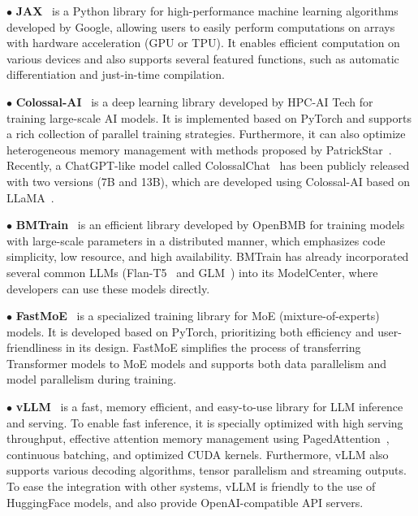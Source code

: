 {{{$\bullet$ \textbf{JAX}~\cite{Bradbury-github-2018-jax} is a Python library for high-performance machine learning algorithms developed by Google, allowing users to easily perform computations on arrays with hardware acceleration (\eg GPU or TPU).   %
{It enables  efficient computation on various devices and also supports  several featured functions, such as automatic differentiation and just-in-time compilation. 
}

{$\bullet$ \textbf{Colossal-AI}~\cite{Bian-CoRR-2021-Colossal-AI} is a deep learning library developed by HPC-AI Tech for training large-scale AI models. It is implemented based on PyTorch and supports a rich collection of  parallel training  strategies.
Furthermore, it can also optimize heterogeneous memory management with methods proposed by PatrickStar~\cite{Fang-arxiv-2021-PatrickStar}.
{Recently, a ChatGPT-like model called ColossalChat~\cite{ColossalChat} has been publicly released with two versions (7B and 13B), which are developed 
using Colossal-AI based on LLaMA~\cite{Touvron-arxiv-2023-LLaMA}.}}

$\bullet$  {\textbf{BMTrain}~\cite{BMTrain} is an efficient library developed by OpenBMB for training models with large-scale parameters in a distributed manner, which emphasizes code simplicity, low resource, and high availability. BMTrain has already incorporated several common LLMs (\eg Flan-T5~\cite{Chung-arxiv-2022-Scaling} and GLM~\cite{Zeng-arxiv-2022-GLM}) into its ModelCenter, where developers can use these models directly.}

$\bullet$ {\textbf{FastMoE}~\cite{He-arXiv-2021-FastMoE} is a specialized training library for MoE (\ie mixture-of-experts) models. It is developed {based on} PyTorch, prioritizing both efficiency and user-friendliness in its design. FastMoE simplifies the process of transferring Transformer models to MoE models and supports both data parallelism and model parallelism during training. }

{$\bullet$ {\textbf{vLLM}~\cite{kwon-2023-SIGOPS-efficient} is a fast, memory efficient, and easy-to-use library for LLM inference and serving. 
To enable fast  inference, it is specially optimized with high serving throughput, effective attention memory management using PagedAttention~\cite{kwon-2023-SIGOPS-efficient}, continuous batching, and optimized CUDA kernels.
Furthermore, vLLM also supports  various decoding algorithms, tensor parallelism and streaming outputs.
To ease the integration with other systems, vLLM is friendly to the use of HuggingFace models, and also provide OpenAI-compatible API servers. }
}

}}}
